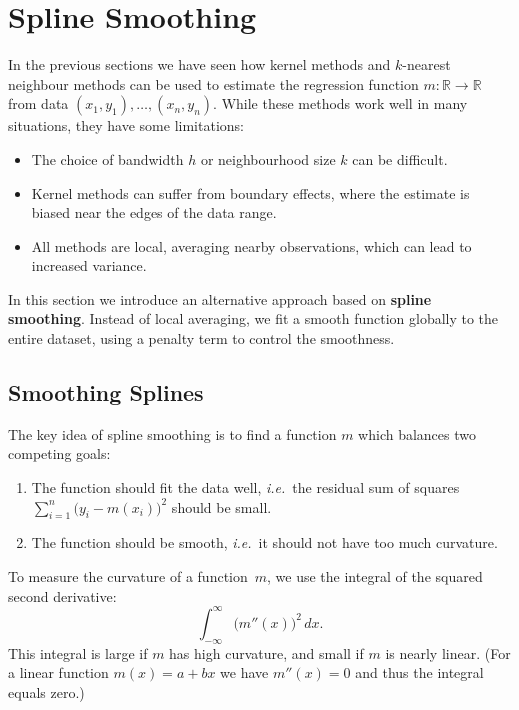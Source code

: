\documentclass[
  a4paper,
]{article}
\providecommand{\tightlist}{%
  \setlength{\itemsep}{0pt}\setlength{\parskip}{0pt}}
\theoremstyle{definition}
\theoremstyle{definition}
\theoremstyle{definition}
\theoremstyle{definition}
\theoremstyle{remark}
\begin{document}
\clearpage

\section{Spline Smoothing}\label{X06-splines}

In the previous sections we have seen how kernel methods and \(k\)-nearest
neighbour methods can be used to estimate the regression function \(m\colon
\mathbb{R}\to \mathbb{R}\) from data \((x_1, y_1), \ldots, (x_n, y_n)\). While these methods
work well in many situations, they have some limitations:

\begin{itemize}
\tightlist
\item
  The choice of bandwidth \(h\) or neighbourhood size \(k\) can be difficult.
\item
  Kernel methods can suffer from boundary effects, where the estimate
  is biased near the edges of the data range.
\item
  All methods are local, averaging nearby observations, which can lead
  to increased variance.
\end{itemize}

In this section we introduce an alternative approach based on \textbf{spline
smoothing}. Instead of local averaging, we fit a smooth function globally
to the entire dataset, using a penalty term to control the smoothness.

\subsection{Smoothing Splines}\label{smoothing-splines}

The key idea of spline smoothing is to find a function \(m\) which balances
two competing goals:

\begin{enumerate}
\def\labelenumi{\arabic{enumi}.}
\tightlist
\item
  The function should fit the data well, \emph{i.e.}~the residual sum of
  squares \(\sum_{i=1}^n \bigl( y_i - m(x_i) \bigr)^2\) should be small.
\item
  The function should be smooth, \emph{i.e.}~it should not have too much
  curvature.
\end{enumerate}

To measure the curvature of a function~\(m\), we use the integral of the
squared second derivative:
\begin{equation*}
  \int_{-\infty}^\infty \bigl( m''(x) \bigr)^2 \,dx.
\end{equation*}
This integral is large if \(m\) has high curvature, and small if \(m\) is
nearly linear. (For a linear function \(m(x) = a + bx\) we have \(m''(x) = 0\)
and thus the integral equals zero.)
\end{document}
